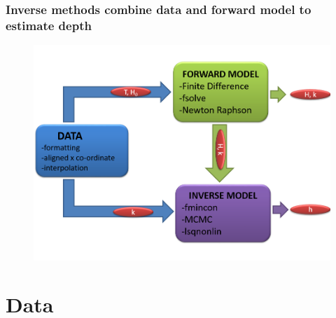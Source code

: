 \documentclass[7pt]{beamer}
\begin{document}
\begin{frame}
\begin{columns}
    \end{columns}
\end{frame}

\begin{frame}
    \frametitle{Inverse methods combine data and forward model to estimate depth}
    
    	\begin{figure}[H]
	 	\centering
	 	\includegraphics[width=1.0\linewidth]{img/Flow_C.png}
	\end{figure}
		
\end{frame}


\section{Data}
\end{document}
